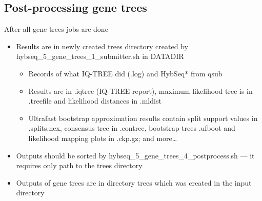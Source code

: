 \documentclass[compress,  xelatex, 11pt, xcolor=x11names, aspectratio=169,
	hyperref={
		bookmarks=true,
		unicode=true,
		colorlinks=true,
		pdftitle={HybSeq course},
		plainpages=false,
		pdfauthor={Vojtech Zeisek},
		pdfsubject={Practical processing of HybSeq target enrichment sequencing data on computing grids like MetaCentrum},
		pdfcreator={XeLaTeX},
		pdfkeywords={BASH, command line, GNU, HybSeq, Linux, MetaCentrum, sequencing shell, target enrichment},
		linkcolor=Turquoise4, %
		anchorcolor=DodgerBlue4, %
		citecolor=DodgerBlue4, %
		filecolor=DodgerBlue4, %
		menucolor=Tan4, %
		urlcolor=DarkOliveGreen4 %
		},
	url={hyphens, lowtilde} %
	]{beamer}
\renewcommand{\texttt}[1]{\colorbox{Cornsilk2}{{\ttfamily #1}}}
\begin{document}
\subsection{Post-processing gene trees}

\begin{frame}{After all gene trees jobs are done}
	\begin{itemize}
		\item Results are in newly created \texttt{trees} directory created by \texttt{hybseq\_5\_gene\_trees\_1\_submitter.sh} in \texttt{DATADIR}
		\begin{itemize}
			\item Records of what IQ-TREE did (\texttt{*.log}) and \texttt{HybSeq*} from \texttt{qsub}
			\item Results are in \texttt{*.iqtree} (IQ-TREE report), maximum likelihood tree is in \texttt{*.treefile} and likelihood distances in \texttt{*.mldist}
			\item Ultrafast bootstrap approximation results contain split support values in \texttt{*.splits.nex}, consensus tree in \texttt{*.contree}, bootstrap trees \texttt{*.ufboot} and likelihood mapping plots in \texttt{*.ckp.gz}; and more\ldots
		\end{itemize}
		\item Outputs should be sorted by \texttt{hybseq\_5\_gene\_trees\_4\_postprocess.sh} --- it requires only path to the \texttt{trees} directory
		\item Outputs of gene trees are in directory \texttt{trees} which was created in the input directory
	\end{itemize}
\end{frame}
\end{document}
